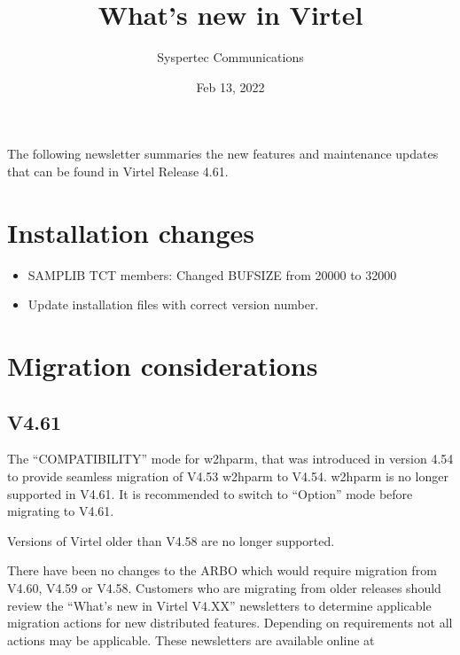 \documentclass[letterpaper,10pt,english]{sphinxmanual}
\title{What's new in Virtel}
\date{Feb 13, 2022}
\author{Syspertec Communications}
\begin{document}
\pagestyle{empty}
\sphinxmaketitle
\pagestyle{plain}
\sphinxtableofcontents
\pagestyle{normal}
\label{\detokenize{TN202101::doc}}


The following newsletter summaries the new features and maintenance updates that can be found in Virtel Release 4.61.


\chapter{Installation changes}
\label{\detokenize{TN202101:installation-changes}}
\begin{itemize}
\item {} 
SAMPLIB TCT members: Changed BUFSIZE from 20000 to 32000

\end{itemize}

\begin{itemize}
\item {} 
Update installation files with correct version number.

\end{itemize}


\chapter{Migration considerations}
\label{\detokenize{TN202101:migration-considerations}}

\section{V4.61}
\label{\detokenize{TN202101:v4-61}}

The “COMPATIBILITY” mode for w2hparm, that was introduced in version 4.54 to provide seamless migration of V4.53 w2hparm to V4.54. w2hparm is no longer supported in V4.61. It is recommended to switch to “Option” mode before migrating to V4.61.


Versions of Virtel older than V4.58 are no longer supported.


There have been no changes to the ARBO which would require migration from V4.60, V4.59 or V4.58. Customers who are migrating from older releases should review the
“What’s new in Virtel V4.XX” newsletters to determine applicable migration actions for new distributed features.
Depending on requirements not all actions may be applicable. These newsletters are available online at 
\end{document}
